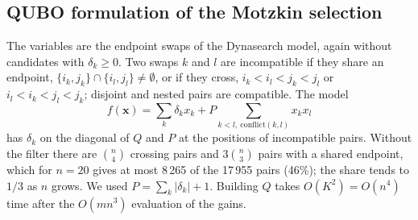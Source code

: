 \documentclass[10pt,twoside,twocolumn,a4paper]{article}
\newif\ifrevmarks \revmarksfalse
\newcommand{\rev}[1]{\ifrevmarks\textcolor{red}{#1}\else#1\fi}
\newenvironment{revblock}{\ifrevmarks\color{red}\fi}{}
\begin{document}
\subsection{\rev{QUBO formulation of the Motzkin selection}}
\begin{revblock}
The variables are the endpoint swaps of the Dynasearch model, again without candidates with $\delta_k\ge 0$. Two swaps $k$ and $l$ are incompatible if they share an endpoint, $\{i_k,j_k\}\cap\{i_l,j_l\}\ne\emptyset$, or if they cross, $i_k<i_l<j_k<j_l$ or $i_l<i_k<j_l<j_k$; disjoint and nested pairs are compatible. The model
\begin{equation}
f(\mathbf{x})=\sum_k\delta_kx_k+P\sum_{k<l,\ \mathrm{conflict}(k,l)}x_kx_l
\end{equation}
has $\delta_k$ on the diagonal of $Q$ and $P$ at the positions of incompatible pairs. Without the filter there are $\binom{n}{4}$ crossing pairs and $3\binom{n}{3}$ pairs with a shared endpoint, which for $n=20$ gives at most 8\,265 of the 17\,955 pairs (46\%); the share tends to $1/3$ as $n$ grows. We used $P=\sum_k|\delta_k|+1$. Building $Q$ takes $O(K^2)=O(n^4)$ time after the $O(mn^3)$ evaluation of the gains.
\end{revblock}
\end{document}
